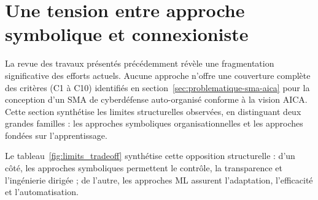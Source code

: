\documentclass[ twoside,openright,titlepage,numbers=noenddot,headinclude,%
                footinclude=true,cleardoublepage=empty,abstractoff, %
                BCOR=5mm,paper=a4,fontsize=11pt,%
                french,american,%
                ]{scrreprt}
\begin{document}
\section{Une tension entre approche symbolique et connexioniste}\label{sec:limits-existing}

La revue des travaux présentés précédemment révèle une fragmentation significative des efforts actuels. Aucune approche n'offre une couverture complète des critères (C1 à C10) identifiés en section~\autoref{sec:problematique-sma-aica} pour la conception d'un SMA de cyberdéfense auto-organisé conforme à la vision AICA. Cette section synthétise les limites structurelles observées, en distinguant deux grandes familles : les approches symboliques organisationnelles et les approches fondées sur l'apprentissage.


Le tableau~\ref{fig:limits_tradeoff} synthétise cette opposition structurelle : d'un côté, les approches symboliques permettent le contrôle, la transparence et l'ingénierie dirigée ; de l'autre, les approches ML assurent l'adaptation, l'efficacité et l'automatisation.
\end{document}
